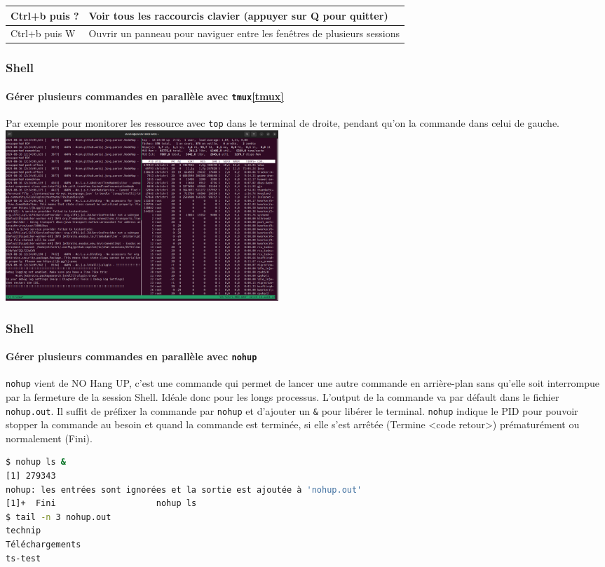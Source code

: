 \documentclass{beamer}
\begin{document}
\begin{frame}
\begin{footnotesize}
\begin{table}[ht]
\begin{tabular}{|p{3.5cm}|p{8cm}|}
                    \hline
                    Ctrl+b puis ?             & Voir tous les raccourcis clavier (appuyer sur Q pour quitter)                   \\
                    \hline
                    Ctrl+b puis W             & Ouvrir un panneau pour naviguer entre les fenêtres de plusieurs sessions        \\
                    \hline
                \end{tabular}
            \end{table}
        \end{footnotesize}
    \end{frame}

    \begin{frame}
        \transdissolve
        \frametitle{Shell}
        \framesubtitle{Gérer plusieurs commandes en parallèle avec \lstinline{tmux}\cref{tmux}}
        Par exemple pour monitorer les ressource avec \lstinline{top} dans le terminal de droite, pendant qu'on la commande dans celui de gauche.
        \bigbreak
        \centering
        \includegraphics[width=10.3cm]{image/tmux-illustration}
    \end{frame}

    \begin{frame}[fragile]
        \transdissolve
        \frametitle{Shell}
        \framesubtitle{Gérer plusieurs commandes en parallèle avec \lstinline{nohup}}
        \lstinline{nohup} vient de NO Hang UP, c'est une commande qui permet de lancer une autre commande en arrière-plan sans qu'elle soit interrompue par la fermeture de la session Shell.
        Idéale donc pour les longs processus.
        L'output de la commande va par défault dans le fichier \lstinline{nohup.out}.
        \bigbreak
        Il suffit de préfixer la commande par \lstinline{nohup} et d'ajouter un \lstinline{&} pour libérer le terminal.
        \lstinline{nohup} indique le PID pour pouvoir stopper la commande au besoin et quand la commande est terminée, si elle s'est arrêtée (Termine <code retour>) prématurément ou normalement (Fini).
        \begin{lstlisting}[language=bash]
$ nohup ls &
[1] 279343
nohup: les entrées sont ignorées et la sortie est ajoutée à 'nohup.out'
[1]+  Fini                    nohup ls
$ tail -n 3 nohup.out
technip
Téléchargements
ts-test
        \end{lstlisting}
    \end{frame}
\end{document}
